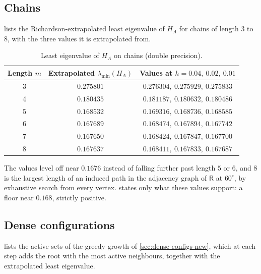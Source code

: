 \documentclass[11pt,reqno]{amsart}
\renewcommand{\_}{\origunderscore\allowbreak}
\numberwithin{equation}{section}
\theoremstyle{plain}
\theoremstyle{definition}
\theoremstyle{remark}
\newcommand{\Rt}{\mathsf{R}}                 %
\begin{document}
\subsection*{Chains}

 lists the Richardson-extrapolated least eigenvalue of
$H_A$ for chains of length $3$ to $8$, with the three values it is
extrapolated from.

\begin{table}[ht]
\centering
\caption{Least eigenvalue of $H_A$ on chains (double precision).}\label{tab:chains}
\renewcommand{\arraystretch}{1.2}
\begin{tabular}{ccc}
\toprule
Length $m$ & Extrapolated $\lambda_{\min}(H_A)$ & Values at $h=0.04,\ 0.02,\ 0.01$\\
\midrule
3 & $0.275801$ & $0.276304,\ 0.275929,\ 0.275833$\\
4 & $0.180435$ & $0.181187,\ 0.180632,\ 0.180486$\\
5 & $0.168532$ & $0.169316,\ 0.168736,\ 0.168585$\\
6 & $0.167689$ & $0.168474,\ 0.167894,\ 0.167742$\\
7 & $0.167650$ & $0.168424,\ 0.167847,\ 0.167700$\\
8 & $0.167637$ & $0.168411,\ 0.167833,\ 0.167687$\\
\bottomrule
\end{tabular}
\end{table}

The values level off near $0.1676$ instead of falling further past
length $5$ or $6$, and $8$ is the largest length of an induced path in the
adjacency graph of $\Rt$ at $60^\circ$, by exhaustive search from every
vertex.  states only what these values support: a
floor near $0.168$, strictly positive.

\subsection*{Dense configurations}

 lists the active sets of the greedy growth of
\cref{sec:dense-configs-new}, which at each step adds the root with the
most active neighbours, together with the extrapolated least eigenvalue.
\end{document}
